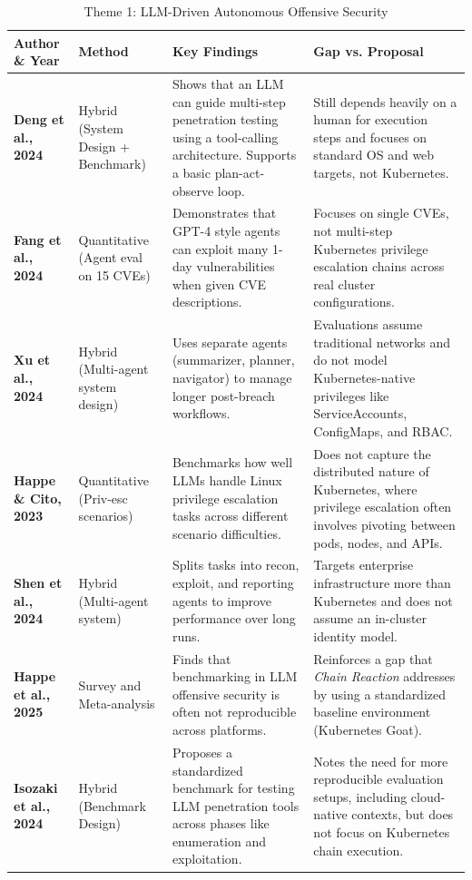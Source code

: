 \documentclass[conference]{IEEEtran}
\begin{document}
\begin{table}[t!]
\centering
\caption{Theme 1: LLM-Driven Autonomous Offensive Security}
\label{tab:litmatrix-theme1}
\scriptsize
\setlength{\tabcolsep}{5pt}
\renewcommand{\arraystretch}{1.3}
\begin{tabularx}{\textwidth}{l p{2.6cm} X X}
\toprule
\textbf{Author \& Year} & \textbf{Method} & \textbf{Key Findings} & \textbf{Gap vs. Proposal} \\
\midrule
\textbf{Deng et al., 2024} \cite{deng2024pentestgpt} & Hybrid (System Design + Benchmark) & Shows that an LLM can guide multi-step penetration testing using a tool-calling architecture. Supports a basic plan-act-observe loop. & Still depends heavily on a human for execution steps and focuses on standard OS and web targets, not Kubernetes. \\
\addlinespace
\textbf{Fang et al., 2024} \cite{fang2024llm} & Quantitative (Agent eval on 15 CVEs) & Demonstrates that GPT-4 style agents can exploit many 1-day vulnerabilities when given CVE descriptions. & Focuses on single CVEs, not multi-step Kubernetes privilege escalation chains across real cluster configurations. \\
\addlinespace
\textbf{Xu et al., 2024} \cite{xu2024autoattacker} & Hybrid (Multi-agent system design) & Uses separate agents (summarizer, planner, navigator) to manage longer post-breach workflows. & Evaluations assume traditional networks and do not model Kubernetes-native privileges like ServiceAccounts, ConfigMaps, and RBAC. \\
\addlinespace
\textbf{Happe \& Cito, 2023} \cite{happe2023llms} & Quantitative (Priv-esc scenarios) & Benchmarks how well LLMs handle Linux privilege escalation tasks across different scenario difficulties. & Does not capture the distributed nature of Kubernetes, where privilege escalation often involves pivoting between pods, nodes, and APIs. \\
\addlinespace
\textbf{Shen et al., 2024} \cite{chen2024pentestagent} & Hybrid (Multi-agent system) & Splits tasks into recon, exploit, and reporting agents to improve performance over long runs. & Targets enterprise infrastructure more than Kubernetes and does not assume an in-cluster identity model. \\
\addlinespace
\textbf{Happe et al., 2025} \cite{happe2025benchmarking} & Survey and Meta-analysis & Finds that benchmarking in LLM offensive security is often not reproducible across platforms. & Reinforces a gap that \emph{Chain Reaction} addresses by using a standardized baseline environment (Kubernetes Goat). \\
\addlinespace
\textbf{Isozaki et al., 2024} \cite{isamu2024towards} & Hybrid (Benchmark Design) & Proposes a standardized benchmark for testing LLM penetration tools across phases like enumeration and exploitation. & Notes the need for more reproducible evaluation setups, including cloud-native contexts, but does not focus on Kubernetes chain execution. \\
\bottomrule
\end{tabularx}
\end{table}
\end{document}
